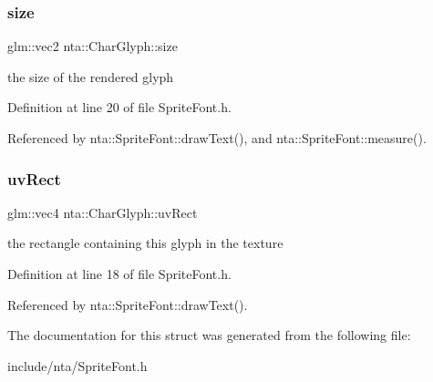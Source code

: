 \subsubsection{\texorpdfstring{size}{size}}
{\footnotesize\ttfamily glm\+::vec2 nta\+::\+Char\+Glyph\+::size}



the size of the rendered glyph 



Definition at line 20 of file Sprite\+Font.\+h.



Referenced by nta\+::\+Sprite\+Font\+::draw\+Text(), and nta\+::\+Sprite\+Font\+::measure().

\mbox{\label{structnta_1_1CharGlyph_a46d9ea9c38c8bf5e1c1679e938019f53}} 
\subsubsection{\texorpdfstring{uv\+Rect}{uvRect}}
{\footnotesize\ttfamily glm\+::vec4 nta\+::\+Char\+Glyph\+::uv\+Rect}



the rectangle containing this glyph in the texture 



Definition at line 18 of file Sprite\+Font.\+h.



Referenced by nta\+::\+Sprite\+Font\+::draw\+Text().



The documentation for this struct was generated from the following file\+:\begin{DoxyCompactItemize}
\item 
include/nta/Sprite\+Font.\+h\end{DoxyCompactItemize}
